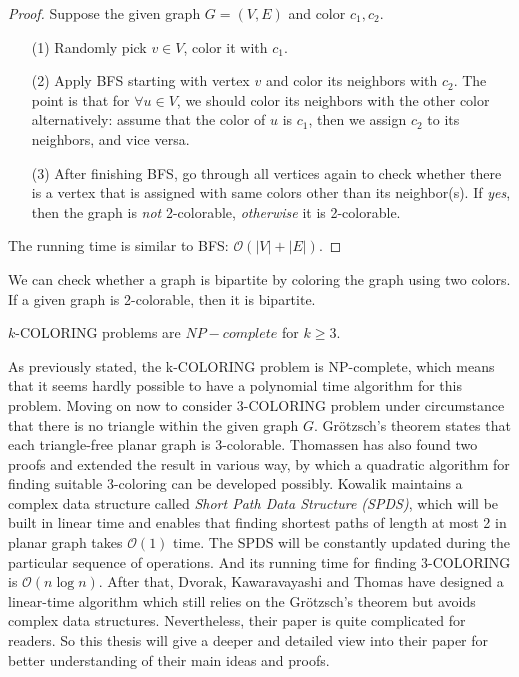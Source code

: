 \begin{proof}
Suppose the given graph $G = (V, E)$ and color $c_1, c_2$. 
\begin{itemize}
    \item[(1)] Randomly pick $v \in V$, color it with $c_1$.
    \item[(2)] Apply BFS starting with vertex $v$ and color its neighbors with $c_2$. The point is that for $\forall u \in V$, we should color its neighbors with the other color alternatively: assume that the color of $u$ is $c_1$, then we assign $c_2$ to its neighbors, and vice versa.
    \item[(3)] After finishing BFS, go through all vertices again to check whether there is a vertex that is assigned with same colors other than its neighbor(s). If \textit{yes}, then the graph is \textit{not} 2-colorable, \textit{otherwise} it is 2-colorable.
\end{itemize}
The running time is similar to BFS: $\mathcal{O}(|V| + |E|)$.
\end{proof}

\begin{observation}
We can check whether a graph is bipartite by coloring the graph using two colors. If a given graph is 2-colorable, then it is bipartite.
\end{observation}

\begin{observation}
$k$-COLORING problems are $NP-complete$ for $k \geq 3$. 
\end{observation}

As previously stated, the k-COLORING problem is NP-complete, which means that it seems hardly possible to have a polynomial time algorithm for this problem. Moving on now to consider 3-COLORING problem under circumstance that there is no triangle within the given graph $G$. Grötzsch’s theorem \cite{grotzsch1959dreifarbensatz} states that each triangle-free planar graph is 3-colorable. Thomassen \cite{Thomassen1994Grtzschs3T} has also found two proofs and extended the result in various way, by which a quadratic algorithm for finding suitable 3-coloring can be developed possibly. Kowalik \cite{article} maintains a complex data structure called \textit{Short Path Data Structure (SPDS)}, which will be built in linear time and enables that finding shortest paths of length at most 2 in planar graph takes $\mathcal{O}(1)$ time. The SPDS will be constantly updated during the particular sequence of operations. And its running time for finding 3-COLORING is $\mathcal{O}(n\log{}n)$. After that, Dvorak, Kawaravayashi and Thomas \cite{dvorak2013threecoloring} have designed a linear-time algorithm which still relies on the Grötzsch’s theorem but avoids complex data structures. Nevertheless, their paper is quite complicated for readers. So this thesis will give a deeper and detailed view into their paper for better understanding of their main ideas and proofs. \\ 

